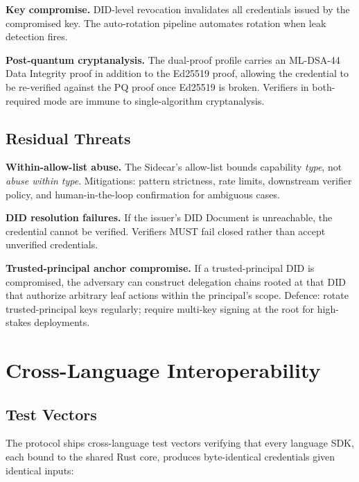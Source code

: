 \documentclass[11pt,a4paper]{article}
\begin{document}
\noindent\textbf{Key compromise.} DID-level revocation invalidates all credentials issued by the compromised key. The auto-rotation pipeline automates rotation when leak detection fires.

\noindent\textbf{Post-quantum cryptanalysis.} The dual-proof profile carries an ML-DSA-44 Data Integrity proof in addition to the Ed25519 proof, allowing the credential to be re-verified against the PQ proof once Ed25519 is broken. Verifiers in both-required mode are immune to single-algorithm cryptanalysis.

\subsection{Residual Threats}

\noindent\textbf{Within-allow-list abuse.} The Sidecar's allow-list bounds capability \emph{type}, not \emph{abuse within type}. Mitigations: pattern strictness, rate limits, downstream verifier policy, and human-in-the-loop confirmation for ambiguous cases.

\noindent\textbf{DID resolution failures.} If the issuer's DID Document is unreachable, the credential cannot be verified. Verifiers MUST fail closed rather than accept unverified credentials.

\noindent\textbf{Trusted-principal anchor compromise.} If a trusted-principal DID is compromised, the adversary can construct delegation chains rooted at that DID that authorize arbitrary leaf actions within the principal's scope. Defence: rotate trusted-principal keys regularly; require multi-key signing at the root for high-stakes deployments.

\section{Cross-Language Interoperability}
\label{sec:interop}

\subsection{Test Vectors}

The protocol ships cross-language test vectors verifying that every language SDK, each bound to the shared Rust core, produces byte-identical credentials given identical inputs:
\end{document}
